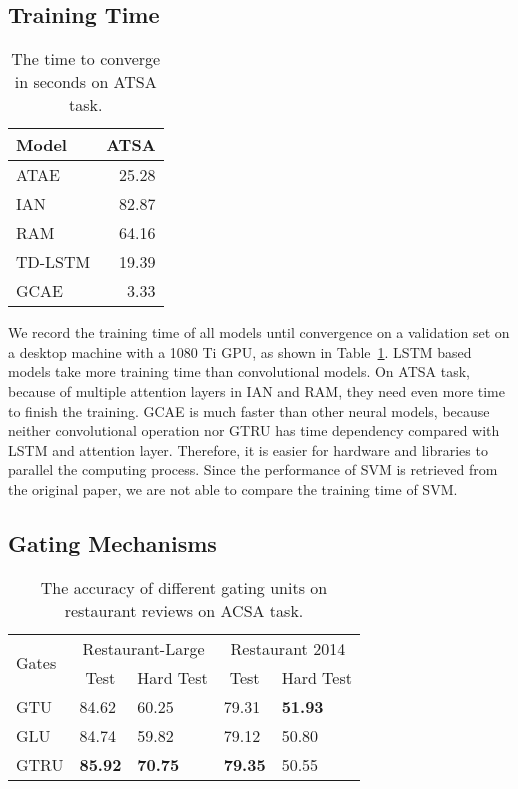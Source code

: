 \documentclass[11pt,a4paper]{article}
\begin{document}
\subsection{Training Time}
\begin{table}
\centering
\begin{tabular}{l|r}
\hline
Model      & ATSA   \\ \hline
ATAE       & 25.28  \\
IAN        & 82.87  \\
RAM        & 64.16  \\
TD-LSTM    & 19.39  \\
GCAE      & 3.33   \\ \hline
\end{tabular}
\caption{The time to converge in seconds on ATSA task.}
\label{tbl:acsa_time}
\end{table}

We record the training time of all models until convergence on a validation set on a desktop machine with a 1080 Ti GPU, as shown in Table~\ref{tbl:acsa_time}.
LSTM based models take more training time than convolutional models. On ATSA task, because of multiple attention layers in IAN and RAM, they need even more time to finish the training.
GCAE is much faster than other neural models, because neither convolutional operation nor GTRU has time dependency compared with LSTM and attention layer. Therefore, it is easier for hardware and libraries to parallel the computing process.
Since the performance of SVM is retrieved from the original paper, we are not able to compare the training time of SVM.

\subsection{Gating Mechanisms}
\begin{table}[]
\centering
\begin{tabular}{l|ll|ll}
\hline
\multirow{2}{*}{Gates}  & \multicolumn{2}{c|}{Restaurant-Large}   & \multicolumn{2}{c}{Restaurant 2014} \\ \cline{2-5} 
& \multicolumn{1}{c}{Test} & \multicolumn{1}{c|}{Hard Test} & \multicolumn{1}{c}{Test} & \multicolumn{1}{c}{Hard Test}  \\ \hline
GTU                   &  84.62    &  60.25    & 79.31    & \textbf{51.93}       \\
GLU                   &  84.74    &  59.82    & 79.12    & 50.80                \\
GTRU                  &  \textbf{85.92}    &  \textbf{70.75}    & \textbf{79.35}        & 50.55   \\ \hline
\end{tabular}
\caption{The accuracy of different gating units on restaurant reviews on ACSA task.}
\label{tbl:gates}
\end{table}
\end{document}
